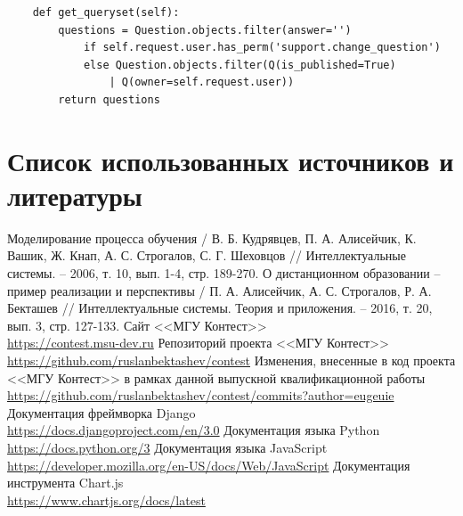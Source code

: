 \documentclass[12pt, a4paper, oneside]{article}
\begin{document}
\begin{enumerate}[wide, labelindent=0pt]
{\begin{verbatim}
    def get_queryset(self):
        questions = Question.objects.filter(answer='') 
            if self.request.user.has_perm('support.change_question') 
            else Question.objects.filter(Q(is_published=True) 
                | Q(owner=self.request.user))
        return questions
        \end{verbatim}
    }
\end{enumerate}
\newpage

\section{Список использованных источников и литературы}
\begingroup
\renewcommand{\section}[2]{}
\begin{thebibliography}{20}
    Моделирование процесса обучения / В. Б. Кудрявцев, П. А. Алисейчик, К. Вашик, Ж. Кнап, А. С. Строгалов, С. Г. Шеховцов // Интеллектуальные системы. – 2006, т. 10, вып. 1-4, стр. 189-270.
    О дистанционном образовании – пример реализации и перспективы / П. А. Алисейчик, А. С. Строгалов, Р. А. Бекташев // Интеллектуальные системы. Теория и приложения. – 2016, т. 20, вып. 3, стр. 127-133.
    Сайт <<МГУ Контест>>\\
    \url{https://contest.msu-dev.ru}
    Репозиторий проекта <<МГУ Контест>>\\
    \url{https://github.com/ruslanbektashev/contest}
    Изменения, внесенные в код проекта <<МГУ Контест>> в рамках данной выпускной квалификационной работы\\
    \url{https://github.com/ruslanbektashev/contest/commits?author=eugeuie}
    Документация фреймворка Django\\
    \url{https://docs.djangoproject.com/en/3.0}
    Документация языка Python\\
    \url{https://docs.python.org/3}
    Документация языка JavaScript\\
    \url{https://developer.mozilla.org/en-US/docs/Web/JavaScript}
    Документация инструмента Chart.js\\
    \url{https://www.chartjs.org/docs/latest}
\end{thebibliography}
\endgroup
\end{document}
